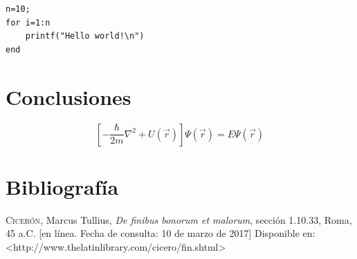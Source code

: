 \documentclass[titlepage,a4paper]{article}
\theoremstyle{definition}
\theoremstyle{remark}
\begin{document}
\begin{lstlisting}[title=hello\_world.m]
n=10;
for i=1:n
	printf("Hello world!\n")
end
\end{lstlisting}

\section{Conclusiones}

\lipsum[5-5]

\begin{equation}
\left[-\frac{\hbar}{2m}\nabla^2 + U(\vec{r}) \right]\Psi(\vec{r}) = E\Psi(\vec{r})
\end{equation}

\section{Bibliografía}

\indent

\leftskip 0.3in
\parindent -0.3in

\textsc{Cicerón}, Marcus Tullius, \textit{De finibus bonorum et malorum}, sección 1.10.33, Roma, 45 a.C. [en línea. Fecha de consulta: 10 de marzo de 2017] Disponible en: <http://www.thelatinlibrary.com/cicero/fin.shtml> 
\end{document}
